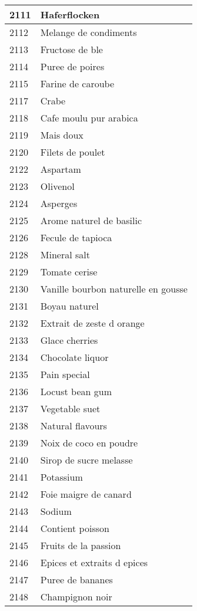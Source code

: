\begin{longtable}{|l|l|}
2111 & Haferflocken \\ \hline 
2112 & Melange de condiments \\ \hline 
2113 & Fructose de ble \\ \hline 
2114 & Puree de poires \\ \hline 
2115 & Farine de caroube \\ \hline 
2117 & Crabe \\ \hline 
2118 & Cafe moulu pur arabica \\ \hline 
2119 & Mais doux \\ \hline 
2120 & Filets de poulet \\ \hline 
2122 & Aspartam \\ \hline 
2123 & Olivenol \\ \hline 
2124 & Asperges \\ \hline 
2125 & Arome naturel de basilic \\ \hline 
2126 & Fecule de tapioca \\ \hline 
2128 & Mineral salt \\ \hline 
2129 & Tomate cerise \\ \hline 
2130 & Vanille bourbon naturelle en gousse \\ \hline 
2131 & Boyau naturel \\ \hline 
2132 & Extrait de zeste d orange \\ \hline 
2133 & Glace cherries \\ \hline 
2134 & Chocolate liquor \\ \hline 
2135 & Pain special \\ \hline 
2136 & Locust bean gum \\ \hline 
2137 & Vegetable suet \\ \hline 
2138 & Natural flavours \\ \hline 
2139 & Noix de coco en poudre \\ \hline 
2140 & Sirop de sucre melasse \\ \hline 
2141 & Potassium \\ \hline 
2142 & Foie maigre de canard \\ \hline 
2143 & Sodium \\ \hline 
2144 & Contient poisson \\ \hline 
2145 & Fruits de la passion \\ \hline 
2146 & Epices et extraits d epices \\ \hline 
2147 & Puree de bananes \\ \hline 
2148 & Champignon noir \\ \hline 

\end{longtable}
